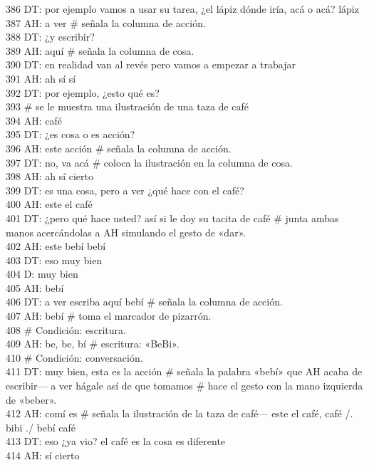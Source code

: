 386 DT: por ejemplo vamos a usar su tarea, ¿el lápiz dónde iría, acá o acá? lápiz\\
387 AH: a ver \# señala la columna de acción.\\
388 DT: ¿y escribir?\\
389 AH: aquí \# señala la columna de cosa.\\
390 DT: en realidad van al revés pero vamos a empezar a trabajar\\
391 AH: ah sí sí\\
392 DT: por ejemplo, ¿esto qué es?\\
393 \# se le muestra una ilustración de una taza de café\\
394 AH: café\\
395 DT: ¿es cosa o es acción?\\
396 AH: este acción \# señala la columna de acción.\\
397 DT: no, va acá \# coloca la ilustración en la columna de cosa.\\
398 AH: ah sí cierto\\
399 DT: es una cosa, pero a ver ¿qué hace con el café?\\
400 AH: este el café\\
401 DT: ¿pero qué hace usted? así si le doy su tacita de café \# junta ambas manos acercándolas a AH simulando el gesto de «dar».\\
402 AH: este bebí bebí\\
403 DT: eso muy bien\\
404 D: muy bien\\
405 AH: bebí\\
406 DT: a ver escriba aquí bebí \# señala la columna de acción.\\
407 AH: bebí \# toma el marcador de pizarrón.\\
408 \# Condición: escritura.\\
409 AH: be, be, bí \# escritura: «BeBi».\\
410 \# Condición: conversación.\\
411 DT: muy bien, esta es la acción \# señala la palabra «bebí» que AH acaba de escribir--- a ver hágale así de que tomamos \# hace el gesto con la mano izquierda de «beber».\\
412 AH: comí es \# señala la ilustración de la taza de café--- este el café, café /. bibi ./ bebí café\\
413 DT: eso ¿ya vio? el café es la cosa es diferente\\
414 AH: sí cierto\\
